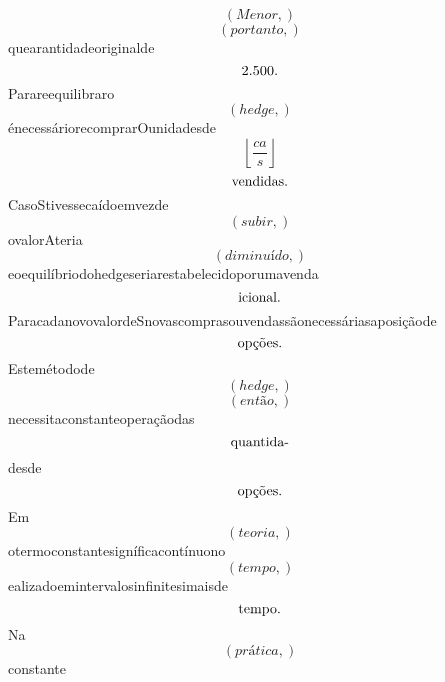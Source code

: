 \documentclass{article}
\begin{document}
\begin{equation}
\left( Menor,\right)
\end{equation}\begin{equation}
\left( portanto,\right)
\end{equation}quearantidadeoriginalde\begin{equation}
$2.500.$
\end{equation}Parareequilibraro\begin{equation}
\left( hedge,\right)
\end{equation}énecessáriorecomprarOunidadesde\begin{equation}
\left\lfloor{\frac{ca}{s}}\right\rfloor
\end{equation}\begin{equation}
$vendidas.$
\end{equation}CasoStivessecaídoemvezde\begin{equation}
\left( subir,\right)
\end{equation}ovalorAteria\begin{equation}
\left( diminuído,\right)
\end{equation}eoequilíbriodohedgeseriarestabelecidoporumavenda\begin{equation}
$icional.$
\end{equation}ParacadanovovalordeSnovascomprasouvendassãonecessáriasaposiçãode\begin{equation}
$opções.$
\end{equation}Estemétodode\begin{equation}
\left( hedge,\right)
\end{equation}\begin{equation}
\left( então,\right)
\end{equation}necessitaconstanteoperaçãodas\begin{equation}
$quantida-$
\end{equation}desde\begin{equation}
$opções.$
\end{equation}Em\begin{equation}
\left( teoria,\right)
\end{equation}otermoconstantesigníficacontínuono\begin{equation}
\left( tempo,\right)
\end{equation}ealizadoemintervalosinfinitesimaisde\begin{equation}
$tempo.$
\end{equation}Na\begin{equation}
\left( prática,\right)
\end{equation}constante\begin{equation}

\end{equation}
\end{document}

